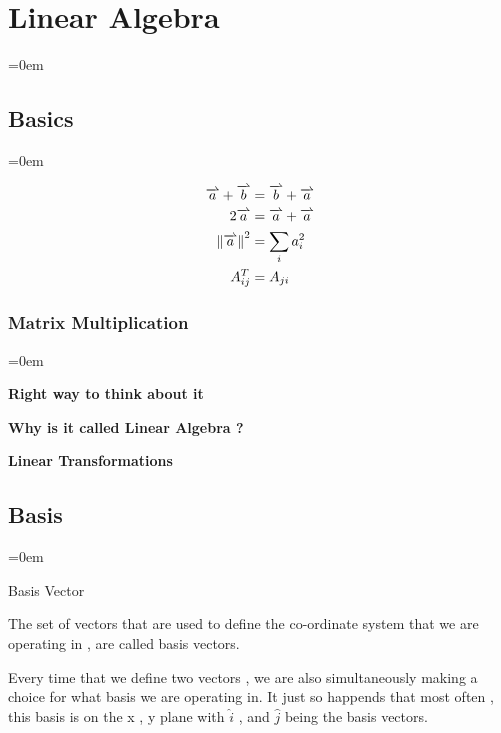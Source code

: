 
\section{Linear Algebra}
\label{sec:linear_algebra}
\parindent=0em

\subsection{Basics}
\label{ssec:basics}
\parindent=0em

\[
	\begin{aligned}
		\harpoon{a} + \harpoon{b} & = \harpoon{b} + \harpoon{a} \\
		2\harpoon{a}              & = \harpoon{a} + \harpoon{a} \\
		{\|\harpoon{a}\|}^{2}     & = \sum_{i}{a}_{i}^{2} \\
		A^{T}_{ij}                & = A_{ji}
	\end{aligned}
\]

\subsubsection{Matrix Multiplication}
\label{sssec:matrix_multiplication}
\parindent=0em

\textbf {Right way to think about it}


\subsubsectionend

\textbf{Why is it called Linear Algebra ?}

\textbf {Linear Transformations}

\subsectionend

\subsection{Basis}
\label{ssec:basis}
\parindent=0em

\tcolorboxdefinition
{Basis Vector}
{\label{def:basis_vector}}
{

The set of vectors that are used to define the co-ordinate system that we are
operating in , are called basis vectors.

}


Every time that we define two vectors , we are also simultaneously making a choice for what basis we are operating in. It just so happends that most often , this basis is on the x , y plane with \( \hat{i} \) , and \( \hat{j} \) being the basis vectors.

